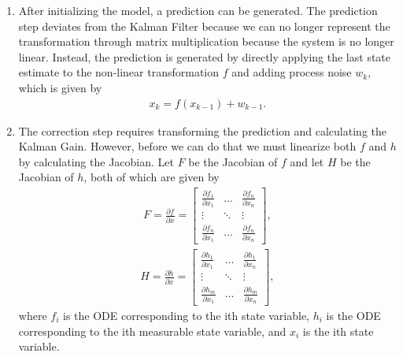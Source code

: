 \begin{enumerate}
  
  \item After initializing the model, a prediction can be generated. The prediction step deviates from the Kalman Filter because we can no longer represent the transformation through matrix multiplication because the system is no longer linear. Instead, the prediction is generated by directly applying the last state estimate to the non-linear transformation $f$ and adding process noise $w_k$, which is given by
  \begin{align*}
      x_{k} = f( x_{k-1} ) + w_{k-1}.
  \end{align*} 
  
  
  \item The correction step requires transforming the prediction and calculating the Kalman Gain. However, before we can do that we must linearize both $f$ and $h$ by calculating the Jacobian. Let $F$ be the Jacobian of $f$ and let $H$ be the Jacobian of $h$, both of which are given by
    \begin{align*}
      F= \frac{\partial f}{\partial x} =
      \begin{bmatrix}
           \frac{\partial f_1}{\partial x_1} & \hdots & \frac{\partial f_n}{\partial x_n} \\
           \vdots & \ddots & \vdots \\
           \frac{\partial f_n}{\partial x_1}  & \hdots & \frac{\partial f_n}{\partial x_n}
         \end{bmatrix}  ,
  \end{align*}
      \begin{align*}
      H = \frac{\partial h}{\partial x} =
     \begin{bmatrix}
           \frac{\partial h_1}{\partial x_1} & \hdots & \frac{\partial h_1}{\partial x_n} \\
           \vdots & \ddots & \vdots \\
           \frac{\partial h_m}{\partial x_1}  & \hdots & \frac{\partial h_{m}}{\partial x_n}
         \end{bmatrix} ,
  \end{align*}
  where $f_i $ is the ODE corresponding to the ith state variable, $h_i$ is the ODE corresponding to the ith measurable state variable, and $x_i$ is the ith state variable. \\ \\
  

\end{enumerate}
